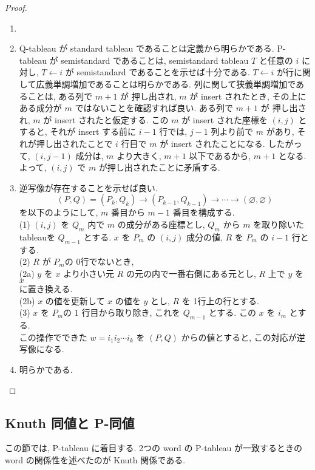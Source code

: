 \documentclass[
  a4paper, 
  12pt,
  ja=standard,
  xelatex,
  left=30truemm,
  right=30truemm,
  titlepage 
]{bxjsarticle}
\theoremstyle{definition}
\begin{document}
\begin{proof}
  \begin{enumerate}
    \item[] 
    \item Q-tableau が standard tableau であることは定義から明らかである. P-tableau が semistandard であることは, 
    semistandard tableau $T$ と任意の $i$ に対し, $T \leftarrow i$ が semistandard であることを示せば十分である.
    $T \leftarrow i$ が行に関して広義単調増加であることは明らかである. 列に関して狭義単調増加であることは, ある列で $m + 1$ が
    押し出され, $m$ が insert されたとき, その上にある成分が $m$ ではないことを確認すれば良い. ある列で $m + 1$ が
    押し出され, $m$ が insert されたと仮定する. この $m$ が insert された座標を $(i, j)$ とすると, 
    それが insert する前に $i - 1$ 行では, $j -1$ 列より前で $m$ があり, それが押し出されたことで
    $i$ 行目で $m$ が insert されたことになる. したがって, $(i, j-1)$ 成分は, $m$ より大きく, $m + 1$ 以下であるから, $m + 1$
    となる. よって, $(i, j)$ で $m$ が押し出されたことに矛盾する. 
    \item 逆写像が存在することを示せば良い. 
    $$(P, Q) = (P_k, Q_k) \rightarrow (P_{k -1}, Q_{k -1}) \rightarrow \cdots \rightarrow (\varnothing, \varnothing)$$
    を以下のようにして, $m$ 番目から $m -  1$ 番目を構成する. \\
    (1) $(i, j)$ を $Q_m$ 内で $m$ の成分がある座標とし, $Q_m$ から $m$ を取り除いた tableauを $Q_{m - 1}$ とする.
    $x$ を $P_{m}$ の $(i, j)$ 成分の値, $R$ を $P_{m}$ の $i - 1$ 行とする. \\
    (2) $R$ が $P_{m}$の 0行でないとき, \\
    \quad (2a) $y$ を $x$ より小さい元 $R$ の元の内で一番右側にある元とし, $R$ 上で $y$ を $x$ \\
    \quad に置き換える. \\
    \quad (2b) $x$ の値を更新して $x$ の値を $y$ とし, $R$ を 1行上の行とする. \\
    (3) $x$ を $P_{m}$の $1$ 行目から取り除き, これを $Q_{m -1}$ とする. この $x$ を $i_m$ とする. \\
    この操作でできた $w = i_1 i_2 \cdots i_k$ を $(P, Q)$ からの値とすると, この対応が逆写像になる.
    \item 明らかである.
  \end{enumerate}
\end{proof}

\subsection{Knuth 同値と P-同値}
この節では, P-tableau に着目する.
2つの word の P-tableau が一致するときの
word の関係性を述べたのが Knuth 関係である.
\end{document}
